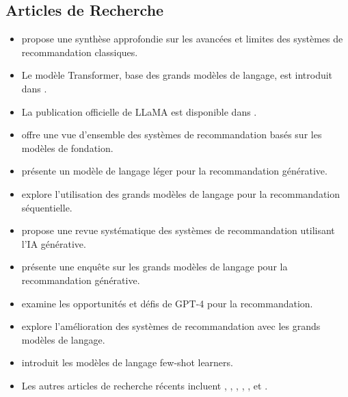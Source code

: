 \subsection*{Articles de Recherche}
\begin{itemize}[leftmargin=1.5cm]
    \item \cite{adomavicius2005toward} propose une synthèse approfondie sur les avancées et limites des systèmes de recommandation classiques.
    \item Le modèle Transformer, base des grands modèles de langage, est introduit dans \cite{vaswani2017attention}.
    \item La publication officielle de LLaMA est disponible dans \cite{touvron2023llama}.
    \item \cite{wang2025fm4recsys} offre une vue d'ensemble des systèmes de recommandation basés sur les modèles de fondation.
    \item \cite{mei2023lightlm} présente un modèle de langage léger pour la recommandation générative.
    \item \cite{harte2023leveraging} explore l'utilisation des grands modèles de langage pour la recommandation séquentielle.
    \item \cite{ayemowa2024systematic} propose une revue systématique des systèmes de recommandation utilisant l'IA générative.
    \item \cite{chen2023llmgenerative} présente une enquête sur les grands modèles de langage pour la recommandation générative.
    \item \cite{tang2023gpt4recommendation} examine les opportunités et défis de GPT-4 pour la recommandation.
    \item \cite{zhang2023recsysLLM} explore l'amélioration des systèmes de recommandation avec les grands modèles de langage.
    \item \cite{brown2020language} introduit les modèles de langage few-shot learners.
    \item Les autres articles de recherche récents incluent \cite{liu2023prompting}, \cite{shen2023llmrec}, \cite{xu2024generative}, \cite{li2023chatrec}, \cite{wei2023gpt4rec}, et \cite{park2024recommendation}.
\end{itemize}

